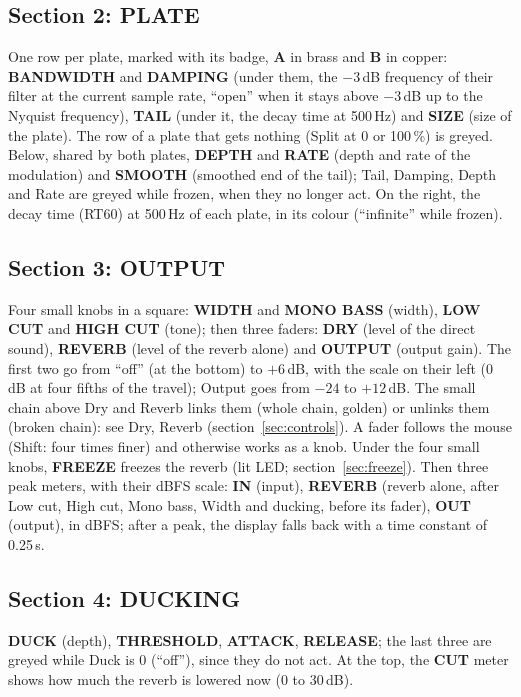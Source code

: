 \documentclass[a4paper,11pt]{article}
\newcommand{\ctl}[1]{\textsf{\textbf{#1}}}   %
\newcommand{\dB}{\,dB}
\begin{document}
\subsection{Section 2: PLATE}
One row per plate, marked with its badge, \ctl{A} in brass and \ctl{B} in copper:
\ctl{BANDWIDTH} and \ctl{DAMPING} (under them, the $-3$\dB{} frequency of their filter at the
current sample rate, ``open'' when it stays above $-3$\dB{} up to the Nyquist frequency),
\ctl{TAIL} (under it, the decay time at 500\,Hz) and \ctl{SIZE} (size of the plate). The row of a
plate that gets nothing (Split at 0 or 100\,\%) is greyed. Below, shared by both plates,
\ctl{DEPTH} and \ctl{RATE} (depth and rate of the modulation) and \ctl{SMOOTH} (smoothed end of
the tail); Tail, Damping, Depth and Rate are
greyed while frozen, when they no longer act. On the right, the decay time (RT60) at 500\,Hz of
each plate, in its colour (``infinite'' while frozen).

\subsection{Section 3: OUTPUT}
Four small knobs in a square: \ctl{WIDTH} and \ctl{MONO BASS} (width), \ctl{LOW CUT} and
\ctl{HIGH CUT} (tone); then three faders: \ctl{DRY} (level of the direct
sound), \ctl{REVERB} (level of the reverb alone) and \ctl{OUTPUT} (output gain). The first two
go from ``off'' (at the bottom) to $+6$\dB, with the scale on their left (0\dB{} at four
fifths of the travel); Output goes from $-24$ to $+12$\dB. The small chain above Dry and Reverb
links them (whole chain, golden) or unlinks them (broken chain): see Dry, Reverb
(section~\ref{sec:controls}). A fader follows the mouse (\textsf{Shift}: four times finer) and
otherwise works as a knob. Under the four small knobs, \ctl{FREEZE} freezes the reverb (lit
LED; section~\ref{sec:freeze}). Then three peak meters, with their dBFS scale: \ctl{IN} (input), \ctl{REVERB} (reverb alone,
after Low cut, High cut, Mono bass, Width and ducking, before its fader), \ctl{OUT} (output), in dBFS;
after a peak, the display falls back with a time constant of 0.25\,s.

\subsection{Section 4: DUCKING}
\ctl{DUCK} (depth), \ctl{THRESHOLD}, \ctl{ATTACK}, \ctl{RELEASE}; the last three are greyed
while Duck is 0 (``off''), since they do not act. At the top, the \ctl{CUT} meter shows how
much the reverb is lowered now (0 to 30\dB).
\end{document}
